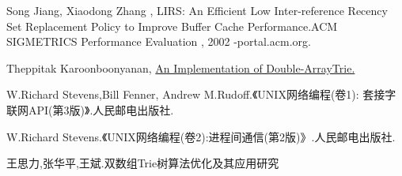 \documentclass[12pt, a4paper, titlepage]{article}
\begin{document}









\newpage
\begin{thebibliography}{9}
Song Jiang, Xiaodong Zhang , LIRS: An Efficient Low Inter-reference 
	Recency Set Replacement Policy to Improve Buffer Cache Performance.ACM 
	SIGMETRICS Performance Evaluation , 2002 -portal.acm.org.\par
{}Theppitak Karoonboonyanan,
\href{http://linux.thai.net/~thep/datrie/datrie.html}{An Implementation of 
	Double-ArrayTrie.}\par
{}W.Richard Stevens,Bill Fenner, Andrew M.Rudoff.《UNIX网络编程(卷1):
	套接字联网API(第3版)》.人民邮电出版社.\par
{}W.Richard Stevens.《UNIX网络编程(卷2):进程间通信(第2版)》.人民邮电出版社.\par
{}王思力,张华平,王斌.双数组Trie树算法优化及其应用研究 \par

\end{thebibliography}
\end{document}

